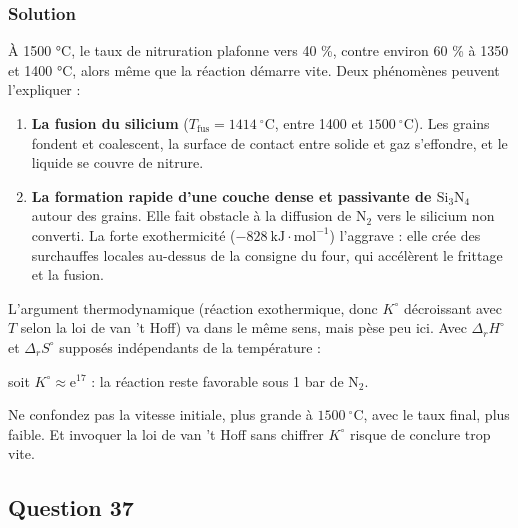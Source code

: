 \documentclass[11pt,a4paper]{article}
\providecommand{\tightlist}{\setlength{\itemsep}{0pt}\setlength{\parskip}{0pt}}
\newcommand{\equationajustee}[1]{%
  \sbox{\boiteequation}{$\displaystyle #1$}%
  \ifdim\wd\boiteequation>\linewidth
    \[\resizebox{\linewidth}{!}{\usebox{\boiteequation}}\]%
  \else
    \[#1\]%
  \fi}
\begin{document}
\hypertarget{solution-35}{%
\subsubsection{Solution}\label{solution-35}}

À 1500 °C, le taux de nitruration plafonne vers 40 \%, contre environ 60 \% à 1350 et 1400 °C, alors même que la réaction démarre vite. Deux phénomènes peuvent l'expliquer :

\begin{enumerate}
\def\labelenumi{\arabic{enumi}.}
\tightlist
\item
  \textbf{La fusion du silicium} (\(T_{\mathrm{fus}}=1414\ ^\circ\mathrm{C}\), entre 1400 et \(1500\ ^\circ\mathrm{C}\)). Les grains fondent et coalescent, la surface de contact entre solide et gaz s'effondre, et le liquide se couvre de nitrure.
\item
  \textbf{La formation rapide d'une couche dense et passivante de \(\mathrm{Si_3N_4}\)} autour des grains. Elle fait obstacle à la diffusion de \(\mathrm{N_2}\) vers le silicium non converti. La forte exothermicité (\(-828\ \mathrm{kJ\cdot mol^{-1}}\)) l'aggrave : elle crée des surchauffes locales au-dessus de la consigne du four, qui accélèrent le frittage et la fusion.
\end{enumerate}

L'argument thermodynamique (réaction exothermique, donc \(K^\circ\) décroissant avec \(T\) selon la loi de van 't Hoff) va dans le même sens, mais pèse peu ici. Avec \(\Delta_rH^\circ\) et \(\Delta_rS^\circ\) supposés indépendants de la température :

\equationajustee{\begin{aligned}
\Delta_rG^\circ(1773\ \mathrm{K})&\approx-828+1773\times0{,}327\\
&\approx-2{,}5\times10^2\ \mathrm{kJ\cdot mol^{-1}}
\end{aligned}}

soit \(K^\circ\approx{\mathrm{e}}^{17}\) : la réaction reste favorable sous 1 bar de \(\mathrm{N_2}\).

\begin{piege}

Ne confondez pas la vitesse initiale, plus grande à \(1500\ ^\circ\mathrm{C}\), avec le taux final, plus faible. Et invoquer la loi de van 't Hoff sans chiffrer \(K^\circ\) risque de conclure trop vite.

\end{piege}

\hypertarget{question-37}{%
\subsection{Question 37}\label{question-37}}
\end{document}
